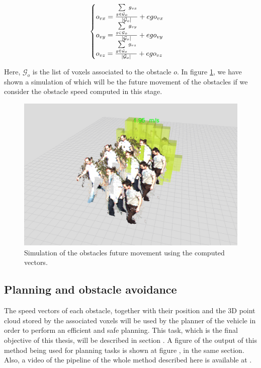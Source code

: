 \begin{equation}\label{eq:cp05_obstacle_vectors_computation}
\begin{cases}
o_{vx} = {{\sum\limits_{g \in \mathcal{G}_o} g_{vx}} \over {|\mathcal{G}_o|}} + ego_{vx}\\
o_{vy} = {{\sum\limits_{g \in \mathcal{G}_o} g_{vy}} \over {|\mathcal{G}_o|}} + ego_{vy}\\
o_{vz} = {{\sum\limits_{g \in \mathcal{G}_o} g_{vz}} \over {|\mathcal{G}_o|}} + ego_{vz}
\end{cases}
\end{equation}

Here, $\mathcal{G}_o$ is the list of voxels associated to the obstacle $o$. In figure \ref{fig:cp05_obstacle_vectors_computation}, we have shown a simulation of which will be the future movement of the obstacles if we consider the obstacle speed computed in this stage.

\begin{figure}[th]
  \centering
  \includegraphics{fakePointCloud}
  \caption{Simulation of the obstacles future movement using the computed vectors.}\label{fig:cp05_obstacle_vectors_computation}
\end{figure}

\subsection{Planning and obstacle avoidance}\label{ch:chapter05_01_06}

The speed vectors of each obstacle, together with their position and the 3D point cloud stored by the associated voxels will be used by the planner of the vehicle in order to perform an efficient and safe planning. This task, which is the final objective of this thesis, will be described in section . A figure of the output of this method being used for planning tasks is shown at figure , in the same section. Also, a video of the pipeline of the whole method described here is available at .

